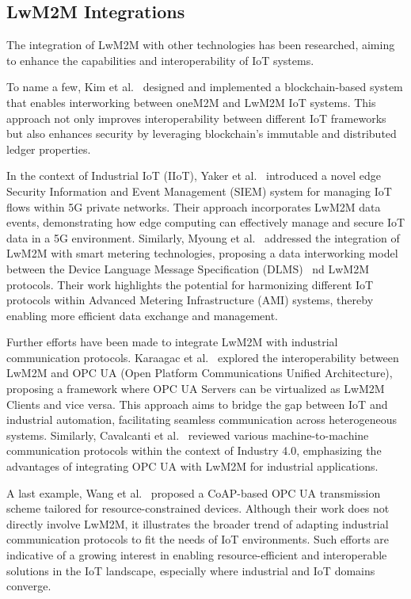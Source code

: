 \documentclass[11pt,sigconf]{iabart}
\begin{document}
\subsection{LwM2M Integrations}


The integration of LwM2M with other technologies has been researched, aiming to enhance the capabilities and interoperability of IoT systems. 

To name a few, Kim et al.~\cite{pop00007} designed and implemented a blockchain-based system that enables interworking between oneM2M and LwM2M IoT systems. This approach not only improves interoperability between different IoT frameworks but also enhances security by leveraging blockchain's immutable and distributed ledger properties. 

In the context of Industrial IoT (IIoT), Yaker et al.~\cite{pop00004} introduced a novel edge Security Information and Event Management (SIEM) system for managing IoT flows within 5G private networks. Their approach incorporates LwM2M data events, demonstrating how edge computing can effectively manage and secure IoT data in a 5G environment. Similarly, Myoung et al.~\cite{pop00012} addressed the integration of LwM2M with smart metering technologies, proposing a data interworking model between the Device Language Message Specification (DLMS)~\cite{dlms-spec} nd LwM2M protocols. Their work highlights the potential for harmonizing different IoT protocols within Advanced Metering Infrastructure (AMI) systems, thereby enabling more efficient data exchange and management.

Further efforts have been made to integrate LwM2M with industrial communication protocols. Karaagac et al.~\cite{pop00013} explored the interoperability between LwM2M and OPC UA (Open Platform Communications Unified Architecture), proposing a framework where OPC UA Servers can be virtualized as LwM2M Clients and vice versa. This approach aims to bridge the gap between IoT and industrial automation, facilitating seamless communication across heterogeneous systems. Similarly, Cavalcanti et al.~\cite{pop00014} reviewed various machine-to-machine communication protocols within the context of Industry 4.0, emphasizing the advantages of integrating OPC UA with LwM2M for industrial applications.

A last example, Wang et al.~\cite{pop00015} proposed a CoAP-based OPC UA transmission scheme tailored for resource-constrained devices. Although their work does not directly involve LwM2M, it illustrates the broader trend of adapting industrial communication protocols to fit the needs of IoT environments. Such efforts are indicative of a growing interest in enabling resource-efficient and interoperable solutions in the IoT landscape, especially where industrial and IoT domains converge.
\end{document}
